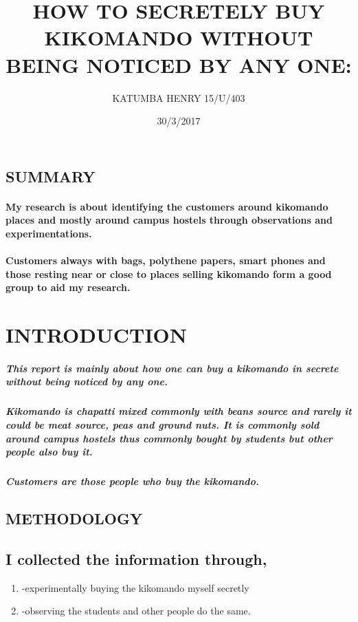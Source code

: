 \documentclass[a4paper,20pt]{report}
\begin{document}
\title{HOW TO SECRETELY BUY KIKOMANDO WITHOUT BEING NOTICED BY ANY ONE:}
\author{KATUMBA HENRY 15/U/403}


\date{30/3/2017}

\maketitle

\subsection{SUMMARY}
\paragraph{My research is about identifying the customers around kikomando places and mostly around campus hostels through observations and experimentations. }
\paragraph{Customers always with bags, polythene papers, smart phones and those resting near or close to places selling kikomando form a good group to aid my research.}

\section{INTRODUCTION}

\subparagraph{This report is mainly about how one can buy a kikomando in secrete without being noticed by any one.}
\subparagraph{Kikomando is chapatti mixed commonly with beans source and rarely it could be meat source, peas and ground nuts. It is commonly sold around campus hostels thus commonly bought by students but other people also buy it.}
\subparagraph{Customers are those people who buy the kikomando.}

\subsection{METHODOLOGY}
\subsection{I collected the information through,}
\begin {enumerate}
\item-experimentally buying the kikomando myself secretly 
\item -observing the students and other people do the same.
\end{enumerate}
\end{document}
